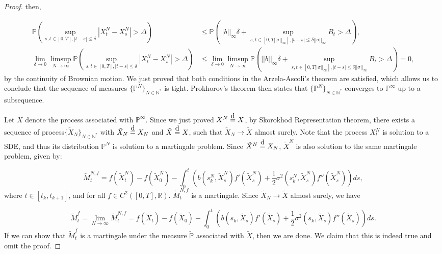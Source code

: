 \documentclass{article}
\newcommand\eqd{\stackrel{\mathclap{\normalfont\mbox{d}}}{=}}
\begin{document}
\begin{proof}
then, 

\begin{equation*}
\begin{aligned}
\mathbb{P}\left(\sup_{s,t\in[0,T],|t-s|\leq\delta}|X_t^N-X_s^N|>\Delta\right)&\leq\mathbb{P}\left(||b||_\infty \delta+ \sup_{s,t\in[0,T||\sigma||_\infty],|t-s|\leq\delta||\sigma||_\infty} B_t>\Delta\right),\\
\lim_{\delta\rightarrow0}\limsup_{N\rightarrow\infty}\mathbb{P}\left(\sup_{s,t\in[0,T],|t-s|\leq\delta}|X_t^N-X_s^N|>\Delta\right)&\leq\lim_{\delta\rightarrow0}\limsup_{N\rightarrow\infty}\mathbb{P}\left(||b||_\infty \delta+ \sup_{s,t\in[0,T||\sigma||_\infty],|t-s|\leq\delta||\sigma||_\infty} B_t>\Delta\right)=0,
\end{aligned}
\end{equation*}
by the continuity of Brownian motion. We just proved that both conditions in the Arzela-Ascoli's theorem are satisfied, which allows us to conclude that the sequence of measures $\{\mathbb{P}^N\}_{N\in\mathbb{N}^*}$ is tight. Prokhorov's theorem then states that $\{\mathbb{P}^N\}_{N\in\mathbb{N}^*}$ converges to $\mathbb{P}^\infty$ up to a subsequence. 

Let $X$ denote the process associated with $\mathbb{P}^\infty$. Since we just proved $X^N\eqd X$, by Skorokhod Representation theorem, there exists a sequence of process$\{\tilde{X}_N\}_{N\in\mathbb{N}^*}$ with $\tilde{X}_N\eqd X_N$ and $\tilde{X}\eqd X$, such that $\tilde{X}_N\rightarrow \tilde{X}$ almost surely. Note that the process $X^N_t$ is solution to a SDE, and thus its distribution $\mathbb{P}^N$ is solution to a martingale problem. Since $\tilde{X}^N\eqd X_N$, $\tilde{X}^N$ is also solution to the same martingale problem, given by:

\begin{equation*}
\tilde{M}^{N,f}_t=f(\tilde{X}_t^N)-f(\tilde{X}_0^N)-\int^t_0\left(b(s_k^N,\tilde{X}_s^N)f'(\tilde{X}^N_s)+\frac{1}{2}\sigma^2(s_k^N,\tilde{X}^N_s)f''(\tilde{X}^N_s)\right)ds,
\end{equation*}
where $t\in[t_k,t_{k+1}]$, and for all $f\in C^2([0,T],\mathbb{R})$. $\tilde{M}^{N,f}_t$ is a martingale. Since $\tilde{X}_N\rightarrow \tilde{X}$ almost surely, we have 

\begin{equation*}
\tilde{M}^{f}_t=\lim_{N\rightarrow\infty}\tilde{M}^{N,f}_t=f(\tilde{X}_t)-f(\tilde{X}_0)-\int^t_0\left(b(s_k,\tilde{X}_s)f'(\tilde{X}_s)+\frac{1}{2}\sigma^2(s_k,\tilde{X}_s)f''(\tilde{X}_s)\right)ds.
\end{equation*}
If we can show that $\tilde{M}^{f}_t$ is a martingale under the measure $\tilde{\mathbb{P}}$ associated with $\tilde{X}$, then we are done. We claim that this is indeed true and omit the proof. 

\end{proof}
\end{document}
